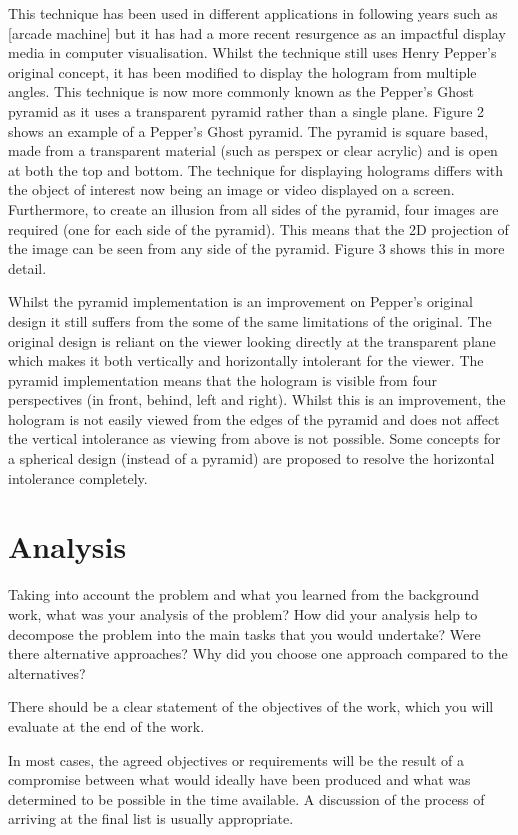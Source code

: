 This technique has been used in different applications in following years such as [arcade machine] but it has had a more recent resurgence as an impactful display media in computer visualisation. Whilst the technique still uses Henry Pepper's original concept, it has been modified to display the hologram from multiple angles. This technique is now more commonly known as the Pepper's Ghost pyramid as it uses a transparent pyramid rather than a single plane. Figure 2 shows an example of a Pepper's Ghost pyramid. The pyramid is square based, made from a transparent material (such as perspex or clear acrylic) and is open at both the top and bottom. The technique for displaying holograms differs with the object of interest now being an image or video displayed on a screen. Furthermore, to create an illusion from all sides of the pyramid, four images are required (one for each side of the pyramid). This  means that the 2D projection of the image can be seen from any side of the pyramid. Figure 3 shows this in more detail. 

Whilst the pyramid implementation is an improvement on Pepper's original design it still suffers from the some of the same limitations of the original. The original design is reliant on the viewer looking directly at the transparent plane which makes it both vertically and horizontally intolerant for the viewer. The pyramid implementation means that the hologram is visible from four perspectives (in front, behind, left and right). Whilst this is an improvement, the hologram is not easily viewed from the edges of the pyramid and does not affect the vertical intolerance as viewing from above is not possible. Some concepts for a spherical design (instead of a pyramid) are proposed to resolve the horizontal intolerance completely. 

\section{Analysis}
Taking into account the problem and what you learned from the background work, what was your analysis of the problem? How did your analysis help to decompose the problem into the main tasks that you would undertake? Were there alternative approaches? Why did you choose one approach compared to the alternatives? 

There should be a clear statement of the objectives of the work, which you will evaluate at the end of the work. 

In most cases, the agreed objectives or requirements will be the result of a compromise between what would ideally have been produced and what was determined to be possible in the time available. A discussion of the process of arriving at the final list is usually appropriate.


